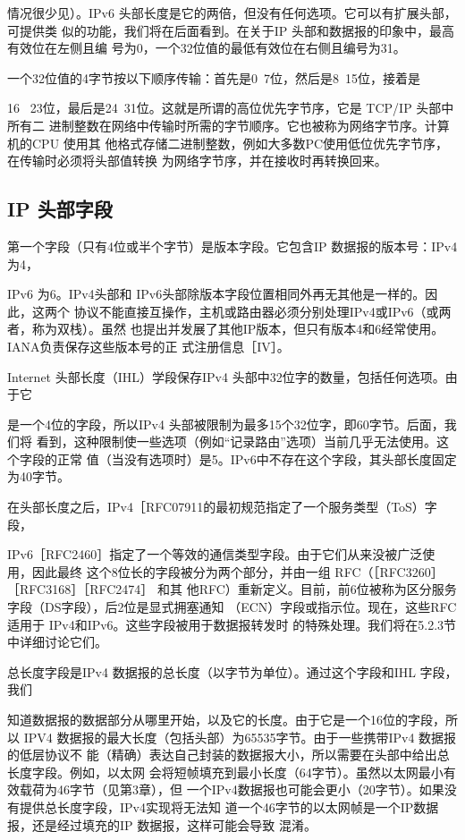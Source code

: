 情况很少见）。IPv6 头部长度是它的两倍，但没有任何选项。它可以有扩展头部，可提供类
似的功能，我们将在后面看到。在关于IP 头部和数据报的印象中，最高有效位在左侧且编
号为0，一个32位值的最低有效位在右侧且编号为31。

一个32位值的4字节按以下顺序传输：首先是0~7位，然后是8~15位，接着是

16 ~23位，最后是24~31位。这就是所谓的高位优先字节序，它是 TCP/IP 头部中所有二
进制整数在网络中传输时所需的字节顺序。它也被称为网络字节序。计算机的CPU 使用其
他格式存储二进制整数，例如大多数PC使用低位优先字节序，在传输时必须将头部值转换
为网络字节序，并在接收时再转换回来。

\subsection{IP 头部字段}
第一个字段（只有4位或半个字节）是版本字段。它包含IP 数据报的版本号：IPv4 为4，

IPv6 为6。IPv4头部和 IPv6头部除版本字段位置相同外再无其他是一样的。因此，这两个
协议不能直接互操作，主机或路由器必须分别处理IPv4或IPv6（或两者，称为双栈）。虽然
也提出并发展了其他IP版本，但只有版本4和6经常使用。IANA负责保存这些版本号的正
式注册信息［IV］。

Internet 头部长度（IHL）学段保存IPv4 头部中32位字的数量，包括任何选项。由于它

是一个4位的字段，所以IPv4 头部被限制为最多15个32位字，即60字节。后面，我们将
看到，这种限制使一些选项（例如“记录路由”选项）当前几乎无法使用。这个字段的正常
值（当没有选项时）是5。IPv6中不存在这个字段，其头部长度固定为40字节。

在头部长度之后，IPv4［RFC07911的最初规范指定了一个服务类型（ToS）字段，

IPv6［RFC2460］指定了一个等效的通信类型字段。由于它们从来没被广泛使用，因此最终
这个8位长的字段被分为两个部分，并由一组 RFC（［RFC3260］［RFC3168］［RFC2474］ 和其
他RFC）重新定义。目前，前6位被称为区分服务字段（DS字段），后2位是显式拥塞通知
（ECN）字段或指示位。现在，这些RFC适用于 IPv4和IPv6。这些字段被用于数据报转发时
的特殊处理。我们将在5.2.3节中详细讨论它们。

总长度字段是IPv4 数据报的总长度（以字节为单位）。通过这个字段和IHL 字段，我们

知道数据报的数据部分从哪里开始，以及它的长度。由于它是一个16位的字段，所以 IPV4
数据报的最大长度（包括头部）为65535字节。由于一些携带IPv4 数据报的低层协议不
能（精确）表达自己封装的数据报大小，所以需要在头部中给出总长度字段。例如，以太网
会将短帧填充到最小长度（64字节）。虽然以太网最小有效载荷为46字节（见第3章），但
一个IPv4数据报也可能会更小（20字节）。如果没有提供总长度字段，IPv4实现将无法知
道一个46字节的以太网帧是一个IP数据报，还是经过填充的IP 数据报，这样可能会导致
混淆。

